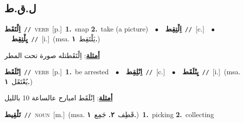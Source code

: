 \documentclass[10pt,a4paper,twoside]{article} %
\begin{document}
\begin{multicols}{2}
\vspace{-3mm}
\subsection*{\color{blue}\foreignlanguage{arabic}{ل.ق.ط}\color{blue}{}} 

{\setlength\topsep{0pt}\textbf{\foreignlanguage{arabic}{اِلْتَقَط}}\ {\color{gray}\texttt{//}\color{black}}\ \textsc{verb}\ [p.]\ \textbf{1.}~snap  \textbf{2.}~take (a picture)\ \ $\bullet$\ \ \setlength\topsep{0pt}\textbf{\foreignlanguage{arabic}{اِلْتِقِط}}\ {\color{gray}\texttt{//}\color{black}}\ [c.]\ \ $\bullet$\ \ \setlength\topsep{0pt}\textbf{\foreignlanguage{arabic}{يِلْتِقِط}}\ {\color{gray}\texttt{//}\color{black}}\ [i.]\ \color{gray}(msa. \foreignlanguage{arabic}{يَلْتَقِط}~\foreignlanguage{arabic}{\textbf{١.}})\color{black}\  \begin{flushright}\color{gray}\foreignlanguage{arabic}{\textbf{\underline{\foreignlanguage{arabic}{أمثلة}}}: اِلْتَقَطتله صورة تحت المطر}\end{flushright}\color{black}} \vspace{2mm}

{\setlength\topsep{0pt}\textbf{\foreignlanguage{arabic}{اِنْلَقَط}}\ {\color{gray}\texttt{//}\color{black}}\ \textsc{verb}\ [p.]\ \textbf{1.}~be arrested\ \ $\bullet$\ \ \setlength\topsep{0pt}\textbf{\foreignlanguage{arabic}{اِنْلِقِط}}\ {\color{gray}\texttt{//}\color{black}}\ [c.]\ \ $\bullet$\ \ \setlength\topsep{0pt}\textbf{\foreignlanguage{arabic}{يِنْلَقَط}}\ {\color{gray}\texttt{//}\color{black}}\ [i.]\ \color{gray}(msa. \foreignlanguage{arabic}{يُعْتَقَل}~\foreignlanguage{arabic}{\textbf{١.}})\color{black}\  \begin{flushright}\color{gray}\foreignlanguage{arabic}{\textbf{\underline{\foreignlanguage{arabic}{أمثلة}}}: اِنْلَقَط امبارح عالساعة 10 بالليل}\end{flushright}\color{black}} \vspace{2mm}

{\setlength\topsep{0pt}\textbf{\foreignlanguage{arabic}{تَلْقِيط}}\ {\color{gray}\texttt{//}\color{black}}\ \textsc{noun}\ [m.]\ \color{gray}(msa. \foreignlanguage{arabic}{قَطِف}~\foreignlanguage{arabic}{\textbf{٢.}}  \foreignlanguage{arabic}{جَمِع}~\foreignlanguage{arabic}{\textbf{١.}})\color{black}\ \textbf{1.}~picking  \textbf{2.}~collecting\ } \vspace{2mm}


\end{multicols}
\end{document}
